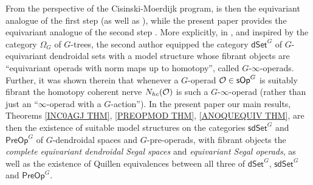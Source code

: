 \documentclass[a4paper,10pt
 ,draft
]{article}%
\begin{document}
From the perspective of the Cisinski-Moerdijk program, 
\cite{Per18} is then the equivariant analogue of the first step \cite{CM11} (as well as \cite{MW09}), 
while the present paper provides the equivariant analogue of the
second step \cite{CM13a}.
More explicitly, in \cite{Per18}, and inspired by the category $\Omega_G$ of $G$-trees,
the second author equipped the category
$\mathsf{dSet}^G$ of $G$-equivariant dendroidal sets with a model structure whose fibrant objects 
are ``equivariant operads with norm maps up to homotopy'',
called $G$-$\infty$-operads.
Further, it was shown therein \cite[Prop. 6.15]{Per18} that whenever a $G$-operad
$\mathcal{O} \in \mathsf{sOp}^G$ is
suitably fibrant the homotopy coherent nerve
$N_{hc}(\mathcal{O})$ is such a 
$G$-$\infty$-operad (rather than just an ``$\infty$-operad with a $G$-action'').
In the present paper our main results,
Theorems \ref{INC0AGJ THM}, \ref{PREOPMOD THM}, \ref{ANOQUEQUIV THM},
are then the existence of suitable model structures on the categories 
$\mathsf{sdSet}^G$ and $\mathsf{PreOp}^G$
of $G$-dendroidal spaces and $G$-pre-operads,
with fibrant objects the \textit{complete equivariant dendroidal Segal spaces} and \textit{equivariant Segal operads},
as well as the existence of Quillen equivalences
between all three of 
$\mathsf{dSet}^G$, $\mathsf{sdSet}^G$ and $\mathsf{PreOp}^G$.
\end{document}
